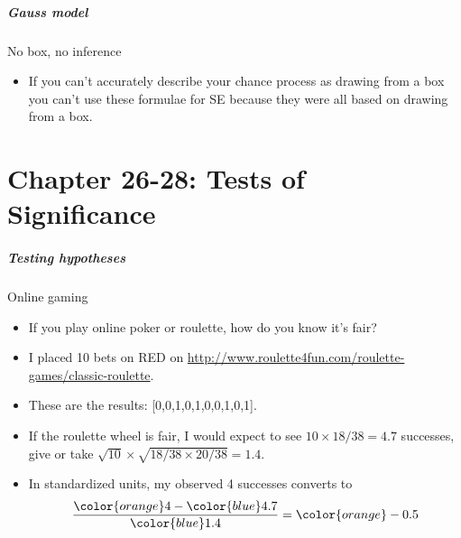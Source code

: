 \documentclass[handout]{beamer}
\begin{document}

   \begin{frame} \frametitle{Gauss model}

   \begin{block}
     {No box, no inference}
     \begin{itemize}
     \item If you can't accurately describe your chance process as
     drawing from a box
     you can't use these formulae for SE because they were all
     based on drawing from a box.

     \end{itemize}
   \end{block}
   \end{frame}

   \part{Chapter 26-28: Tests of Significance}
   \frame{\partpage}


   \begin{frame} \frametitle{Testing hypotheses}

   \begin{block}
   {Online gaming}
   \begin{itemize}
   \item If you play online poker or roulette, how do you know it's fair?

   \item I placed 10 bets on {\color{red} RED} on
   \href{http://www.roulette4fun.com/roulette-games/classic-roulette}{http://www.roulette4fun.com/roulette-games/classic-roulette}.

   \item These are the results: [0,0,1,0,1,0,0,1,0,1].

   \item If the roulette wheel is fair,
   I would expect to see $10 \times 18/ 38=4.7$ successes, give or take
   $\sqrt{10} \times \sqrt{18/38 \times 20/38}=1.4$.

   \item In standardized units, my observed 4 successes converts to
   $$
   \frac{{\color{orange} 4} - {\color{blue} 4.7}}{{\color{blue} 1.4}} = {\color{orange} -0.5}
   $$

   \end{itemize}
   \end{block}
   \end{frame}
\end{document}
